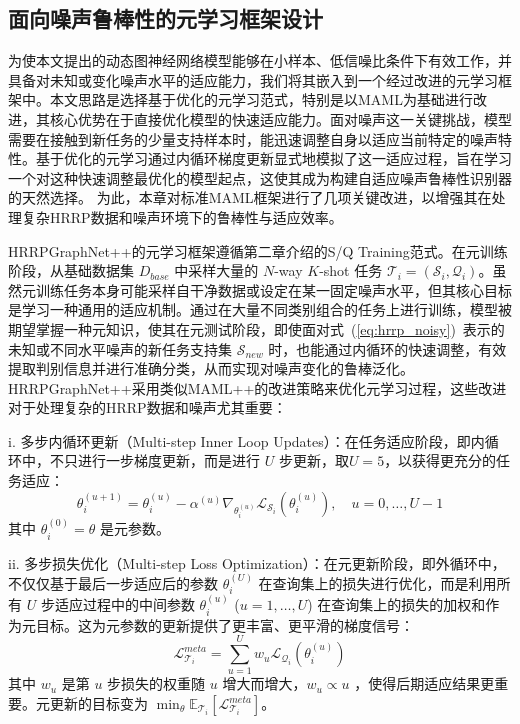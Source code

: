 \subsection{面向噪声鲁棒性的元学习框架设计}
\label{subsec:meta_learning_noise_robust}

为使本文提出的动态图神经网络模型能够在小样本、低信噪比条件下有效工作，并具备对未知或变化噪声水平的适应能力，我们将其嵌入到一个经过改进的元学习框架中。本文思路是选择基于优化的元学习范式，特别是以MAML为基础进行改进，其核心优势在于直接优化模型的快速适应能力。面对噪声这一关键挑战，模型需要在接触到新任务的少量支持样本时，能迅速调整自身以适应当前特定的噪声特性。基于优化的元学习通过内循环梯度更新显式地模拟了这一适应过程，旨在学习一个对这种快速调整最优化的模型起点，这使其成为构建自适应噪声鲁棒性识别器的天然选择。 为此，本章对标准MAML框架进行了几项关键改进，以增强其在处理复杂HRRP数据和噪声环境下的鲁棒性与适应效率。

HRRPGraphNet++的元学习框架遵循第二章介绍的S/Q Training范式。在元训练阶段，从基础数据集 $D_{base}$ 中采样大量的 $N$-way $K$-shot 任务 $\mathcal{T}_i = (\mathcal{S}_i, \mathcal{Q}_i)$。虽然元训练任务本身可能采样自干净数据或设定在某一固定噪声水平，但其核心目标是学习一种通用的适应机制。通过在大量不同类别组合的任务上进行训练，模型被期望掌握一种元知识，使其在元测试阶段，即使面对式~(\ref{eq:hrrp_noisy})~表示的未知或不同水平噪声的新任务支持集 $\mathcal{S}_{new}$ 时，也能通过内循环的快速调整，有效提取判别信息并进行准确分类，从而实现对噪声变化的鲁棒泛化。HRRPGraphNet++采用类似MAML++的改进策略来优化元学习过程，这些改进对于处理复杂的HRRP数据和噪声尤其重要：

i.  多步内循环更新（Multi-step Inner Loop Updates）：在任务适应阶段，即内循环中，不只进行一步梯度更新，而是进行 $U$ 步更新，取$U=5$，以获得更充分的任务适应：
    \begin{equation}
        \theta_i^{(u+1)} = \theta_i^{(u)} - \alpha^{(u)} \nabla_{\theta_i^{(u)}} \mathcal{L}_{\mathcal{S}_i}(\theta_i^{(u)}), \quad u=0, \dots, U-1
        \label{eq:multi_step_inner_update}
    \end{equation}
    其中 $\theta_i^{(0)} = \theta$ 是元参数。

ii.  多步损失优化（Multi-step Loss Optimization）：在元更新阶段，即外循环中，不仅仅基于最后一步适应后的参数 $\theta_i^{(U)}$ 在查询集上的损失进行优化，而是利用所有 $U$ 步适应过程中的中间参数 $\theta_i^{(u)}$ ($u=1, \dots, U$) 在查询集上的损失的加权和作为元目标。这为元参数的更新提供了更丰富、更平滑的梯度信号：
    \begin{equation}
        \mathcal{L}_{\mathcal{T}_i}^{meta} = \sum_{u=1}^{U} w_u \mathcal{L}_{\mathcal{Q}_i}(\theta_i^{(u)})
        \label{eq:multi_step_loss}
    \end{equation}
    其中 $w_u$ 是第 $u$ 步损失的权重随 $u$ 增大而增大，$w_u \propto u$ ，使得后期适应结果更重要。元更新的目标变为 $\min_{\theta} \mathbb{E}_{\mathcal{T}_i} [\mathcal{L}_{\mathcal{T}_i}^{meta}]$。

